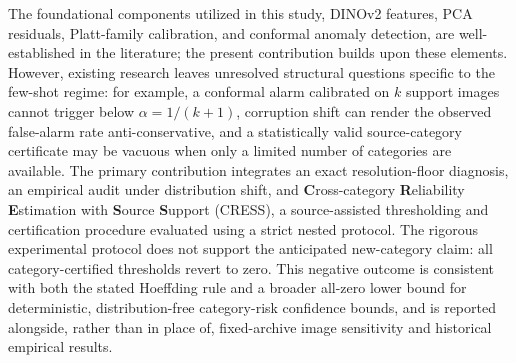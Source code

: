 The foundational components utilized in this study, DINOv2 features, PCA residuals, Platt-family calibration, and conformal anomaly detection, are well-established in the literature; the present contribution builds upon these elements. However, existing research leaves unresolved structural questions specific to the few-shot regime: for example, a conformal alarm calibrated on $k$ support images cannot trigger below $\alpha=1/(k{+}1)$, corruption shift can render the observed false-alarm rate anti-conservative, and a statistically valid source-category certificate may be vacuous when only a limited number of categories are available. The primary contribution integrates an exact resolution-floor diagnosis, an empirical audit under distribution shift, and \textbf{C}ross-category \textbf{R}eliability \textbf{E}stimation with \textbf{S}ource \textbf{S}upport (CRESS), a source-assisted thresholding and certification procedure evaluated using a strict nested protocol. The rigorous experimental protocol does not support the anticipated new-category claim: all category-certified thresholds revert to zero. This negative outcome is consistent with both the stated Hoeffding rule and a broader all-zero lower bound for deterministic, distribution-free category-risk confidence bounds, and is reported alongside, rather than in place of, fixed-archive image sensitivity and historical empirical results.

